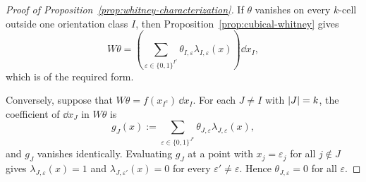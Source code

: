 \begin{proof}[Proof of Proposition~\ref{prop:whitney-characterization}]
If $\theta$ vanishes on every $k$-cell outside one orientation class $I$, then
Proposition~\ref{prop:cubical-whitney} gives
\[
W\theta=
\left(
\sum_{\varepsilon\in\{0,1\}^{I^c}}
\theta_{I,\varepsilon}\lambda_{I,\varepsilon}(x)
\right)\dd x_I,
\]
which is of the required form.

Conversely, suppose that $W\theta=f(x_{I^c})\,\dd x_I$. For each
$J\neq I$ with $\lvert J \rvert=k$, the coefficient of $\dd x_J$ in $W\theta$ is
\[
g_J(x):=
\sum_{\varepsilon\in\{0,1\}^{J^c}}
\theta_{J,\varepsilon}\lambda_{J,\varepsilon}(x),
\]
and $g_J$ vanishes identically. Evaluating $g_J$ at a point with
$x_j=\varepsilon_j$ for all $j\notin J$ gives $\lambda_{J,\varepsilon}(x)=1$
and $\lambda_{J,\varepsilon'}(x)=0$ for every $\varepsilon'\neq\varepsilon$.
Hence $\theta_{J,\varepsilon}=0$ for all $\varepsilon$.
\end{proof}
